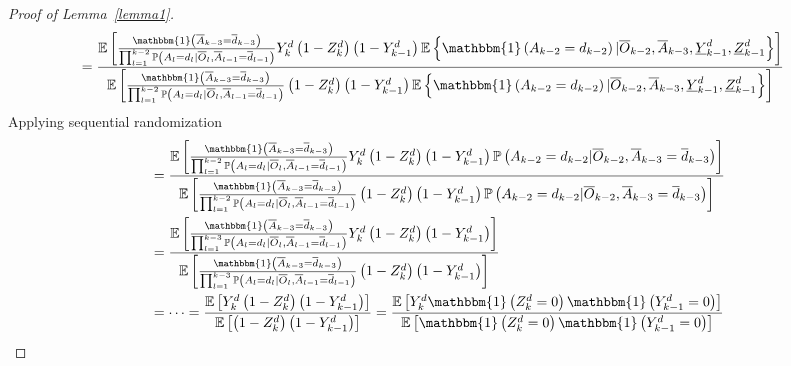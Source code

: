 \documentclass[12pt]{article}
\begin{document}
\begin{proof}[Proof of Lemma~\ref{lemma1}]
\begin{align*}
&=\frac{\mathbb{E} \left[ \frac{\mathbbm{1} \left( \overline{A}_{k-3} = \overline{d}_{k-3} \right) }{\prod_{l=1}^{k-2}  \mathbb{P} \left(A_l = d_l \vert \overline{O}_l, \overline{A}_{l-1} = \overline{d}_{l-1} \right)} Y_{k}^d \left(1-Z_{k}^d \right) \left(1-Y_{k-1}^d \right) \mathbb{E} \left\lbrace \mathbbm{1} \left( A_{k-2} = d_{k-2} \right) \vert  \overline{O}_{k-2}, \overline{A}_{k-3}, \underline{Y}_{k-1}^d, \underline{Z}_{k-1}^d \right\rbrace \right]}{\mathbb{E} \left[ \frac{\mathbbm{1} \left( \overline{A}_{k-3} = \overline{d}_{k-3} \right)}{\prod_{l=1}^{k-2}  \mathbb{P} \left(A_l = d_l \vert \overline{O}_l, \overline{A}_{l-1} = \overline{d}_{l-1} \right)} \left(1-Z_{k}^d \right) \left(1-Y_{k-1}^d \right) \mathbb{E} \left\lbrace \mathbbm{1} \left( A_{k-2} = d_{k-2} \right) \vert  \overline{O}_{k-2}, \overline{A}_{k-3}, \underline{Y}_{k-1}^d, \underline{Z}_{k-1}^d \right\rbrace \right]} 
\end{align*}
Applying sequential randomization
\begin{align*}
&=\frac{\mathbb{E} \left[ \frac{\mathbbm{1} \left( \overline{A}_{k-3} = \overline{d}_{k-3} \right) }{\prod_{l=1}^{k-2} \mathbb{P} \left(A_l = d_l \vert \overline{O}_l, \overline{A}_{l-1} = \overline{d}_{l-1} \right)} Y_{k}^d \left(1-Z_{k}^d \right) \left(1-Y_{k-1}^d \right) \mathbb{P} \left( A_{k-2} = d_{k-2} \vert  \overline{O}_{k-2}, \overline{A}_{k-3} = \overline{d}_{k-3} \right) \right]}{\mathbb{E} \left[ \frac{\mathbbm{1} \left( \overline{A}_{k-3} = \overline{d}_{k-3} \right)}{\prod_{l=1}^{k-2}  \mathbb{P} \left(A_l = d_l \vert \overline{O}_l, \overline{A}_{l-1} = \overline{d}_{l-1} \right)} \left(1-Z_{k}^d \right) \left(1-Y_{k-1}^d \right) \mathbb{P} \left( A_{k-2} = d_{k-2} \vert  \overline{O}_{k-2}, \overline{A}_{k-3} = \overline{d}_{k-3} \right) \right]} \\
&= \frac{\mathbb{E} \left[ \frac{\mathbbm{1} \left( \overline{A}_{k-3} = \overline{d}_{k-3} \right) }{\prod_{l=1}^{k-3}  \mathbb{P} \left(A_l = d_l \vert \overline{O}_l, \overline{A}_{l-1} = \overline{d}_{l-1} \right)} Y_{k}^d \left(1-Z_{k}^d \right) \left(1-Y_{k-1}^d \right) \right]}{\mathbb{E} \left[ \frac{\mathbbm{1} \left( \overline{A}_{k-3} = \overline{d}_{k-3} \right)}{\prod_{l=1}^{k-3}  \mathbb{P} \left(A_l = d_l \vert \overline{O}_l, \overline{A}_{l-1} = \overline{d}_{l-1} \right)} \left(1-Z_{k}^d \right) \left(1-Y_{k-1}^d \right) \right]} \\
& = \dots =\frac{\mathbb{E} \left[ Y_{k}^d \left(1-Z_{k}^d \right) \left(1-Y_{k-1}^d \right) \right]}{\mathbb{E} \left[ \left(1-Z_{k}^d \right) \left(1-Y_{k-1}^d \right) \right]} =\frac{\mathbb{E} \left[ Y_{k}^d \mathbbm{1} \left(Z_{k}^d = 0\right) \mathbbm{1} \left(Y_{k-1}^d = 0\right) \right]}{\mathbb{E} \left[ \mathbbm{1} \left(Z_{k}^d = 0\right) \mathbbm{1} \left(Y_{k-1}^d = 0\right) \right]} \\

\end{align*}
\end{proof}
\end{document}
